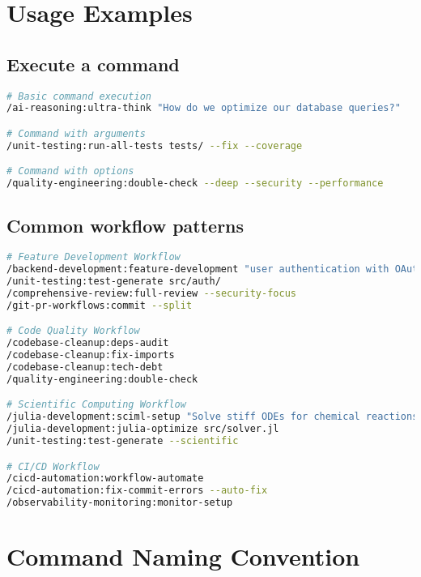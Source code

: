 \documentclass[11pt,a4paper]{article}
\begin{document}
\section{Usage Examples}

\subsection{Execute a command}

\begin{lstlisting}[language=bash]
# Basic command execution
/ai-reasoning:ultra-think "How do we optimize our database queries?"

# Command with arguments
/unit-testing:run-all-tests tests/ --fix --coverage

# Command with options
/quality-engineering:double-check --deep --security --performance
\end{lstlisting}

\subsection{Common workflow patterns}

\begin{lstlisting}[language=bash]
# Feature Development Workflow
/backend-development:feature-development "user authentication with OAuth2"
/unit-testing:test-generate src/auth/
/comprehensive-review:full-review --security-focus
/git-pr-workflows:commit --split

# Code Quality Workflow
/codebase-cleanup:deps-audit
/codebase-cleanup:fix-imports
/codebase-cleanup:tech-debt
/quality-engineering:double-check

# Scientific Computing Workflow
/julia-development:sciml-setup "Solve stiff ODEs for chemical reactions"
/julia-development:julia-optimize src/solver.jl
/unit-testing:test-generate --scientific

# CI/CD Workflow
/cicd-automation:workflow-automate
/cicd-automation:fix-commit-errors --auto-fix
/observability-monitoring:monitor-setup
\end{lstlisting}

\newpage
\section{Command Naming Convention}
\end{document}
